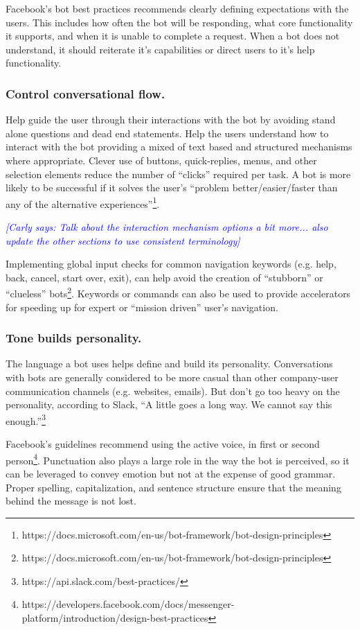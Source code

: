 \documentclass{sig-alternate}
\newcommand{\cl}[1]{\textcolor{blue}{{\it [Carly says: #1]}}}
\begin{document}
	Facebook's bot best practices recommends clearly defining expectations with the users.  This includes how often the bot will be responding, what core functionality it supports, and when it is unable to complete a request.  When a bot does not understand, it should reiterate it's capabilities or direct users to it's help functionality.


	\subsubsection{Control conversational flow.}

	Help guide the user through their interactions with the bot by avoiding stand alone questions and dead end statements. Help the users understand how to interact with the bot providing a mixed of text based and structured  mechanisms where appropriate.  Clever use of buttons, quick-replies, menus, and other selection elements reduce the number of ``clicks'' required per task.  A bot is more likely to be successful if it solves the user's ``problem better/easier/faster than any of the alternative experiences''\footnote{https://docs.microsoft.com/en-us/bot-framework/bot-design-principles}.

	\cl{Talk about the interaction mechanism options a bit more... also update the other sections to use consistent terminology}

	Implementing global input checks for common navigation keywords (e.g. help, back, cancel, start over, exit), can help avoid the creation of ``stubborn'' or ``clueless'' bots\footnote{https://docs.microsoft.com/en-us/bot-framework/bot-design-principles}. Keywords or commands can also be used to provide accelerators for speeding up for expert or ``mission driven'' user's navigation. 

	\subsubsection{Tone builds personality.}

	The language a bot uses helps define and build its personality.  Conversations with bots are generally considered to be more casual than other company-user communication channels (e.g. websites, emails). But don't go too heavy on the personality, according to Slack, ``A little goes a long way. We cannot say this enough.''\footnote{https://api.slack.com/best-practices/}

	Facebook's guidelines recommend using the active voice, in first or second person\footnote{https://developers.facebook.com/docs/messenger-platform/introduction/design-best-practices}.  Punctuation also plays a large role in the way the bot is perceived, so it can be leveraged to convey emotion but not at the expense of good grammar.  Proper spelling, capitalization, and sentence structure ensure that the meaning behind the message is not lost.  
\end{document}

